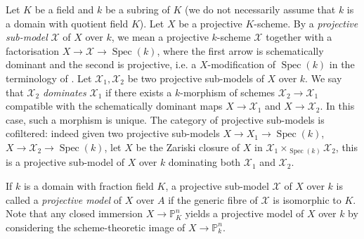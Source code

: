 \documentclass [11pt,reqno]{amsart}
\newcommand{\1}{\mathmybb{1}}
\def\cX{{\mathcal{X}}}
\def\Frac{\operatorname{Frac}}
\def\Spec{\operatorname{Spec}}
\begin{document}
Let $K$ be a field and $k$ be a subring of $K$ (we do not necessarily assume that $k$ is a domain with quotient field $K$). Let $X$ be a projective $K$-scheme. By a \emph{projective sub-model} $\cX$ of $X$ over $k$, we mean a projective $k$-scheme $\cX$ together with a factorisation $X\to \cX \to \Spec(k)$, where the first arrow is schematically dominant and the second is projective, i.e. a $X$-modification of $\Spec(k)$ in the terminology of \cite{Temkin11}. Let $\cX_{1},\cX_{2}$ be two projective sub-models of $X$ over $k$. We say that $\cX_{2}$ \emph{dominates} $\cX_{1}$ if there exists a $k$-morphism of schemes $\cX_{2} \to \cX_{1}$ compatible with the schematically dominant maps $X\to \cX_{1}$ and $X\to \cX_{2}$. In this case, such a morphism is unique. The category of projective sub-models is cofiltered: indeed given two projective sub-models $X \to X_{1} \to \Spec(k)$, $X \to \cX_{2} \to \Spec(k)$, let $X$ be the Zariski closure of $X$ in $\cX_{1}\times_{\Spec(k)}\cX_{2}$, this is a projective sub-model of $X$ over $k$ dominating both $\cX_{1}$ and $\cX_{2}$.  

If $k$ is a domain with fraction field $K$, a projective sub-model $\cX$ of $X$ over $k$ is called a \emph{projective model} of $X$ over $A$ if the generic fibre of $\cX$ is isomorphic to $K$. Note that any closed immersion $X\to \mathbb{P}^{n}_{K}$ yields a projective model of $X$ over $k$ by considering the scheme-theoretic image of $X\to \mathbb{P}^{n}_{k}$. 

\end{document}
